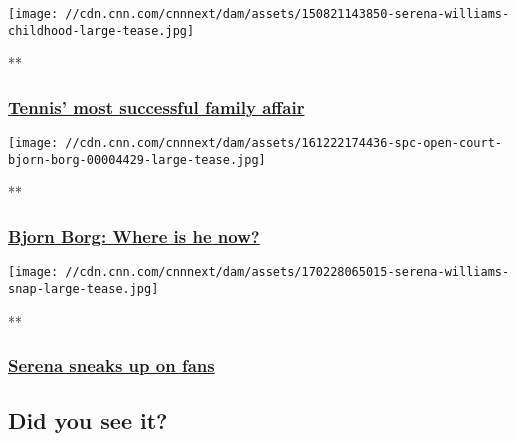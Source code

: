 \href{/videos/sports/2017/01/27/australian-open-williams-sisters-childhood.cnn}{}

\texttt{[image: //cdn.cnn.com/cnnnext/dam/assets/150821143850-serena-williams-childhood-large-tease.jpg]}

**

\hypertarget{tennis-most-successful-family-affair}{%
\subsubsection{\texorpdfstring{\href{/videos/sports/2017/01/27/australian-open-williams-sisters-childhood.cnn}{Tennis'
most successful family
affair}}{Tennis' most successful family affair}}\label{tennis-most-successful-family-affair}}

\href{/videos/sports/2016/12/22/spc-open-court-bjorn-borg.cnn}{}

\texttt{[image: //cdn.cnn.com/cnnnext/dam/assets/161222174436-spc-open-court-bjorn-borg-00004429-large-tease.jpg]}

**

\hypertarget{bjorn-borg-where-is-he-now}{%
\subsubsection{\texorpdfstring{\href{/videos/sports/2016/12/22/spc-open-court-bjorn-borg.cnn}{Bjorn
Borg: Where is he
now?}}{Bjorn Borg: Where is he now?}}\label{bjorn-borg-where-is-he-now}}

\href{/videos/sports/2017/02/28/serena-williams-surprises-fans-tennis-court-es.cnn}{}

\texttt{[image: //cdn.cnn.com/cnnnext/dam/assets/170228065015-serena-williams-snap-large-tease.jpg]}

**

\hypertarget{serena-sneaks-up-on-fans}{%
\subsubsection{\texorpdfstring{\href{/videos/sports/2017/02/28/serena-williams-surprises-fans-tennis-court-es.cnn}{Serena
sneaks up on
fans}}{Serena sneaks up on fans}}\label{serena-sneaks-up-on-fans}}

\hypertarget{did-you-see-it-}{%
\subsection{Did you see it?~}\label{did-you-see-it-}}

\href{/videos/sports/2016/12/22/spc-open-court-outtakes.cnn}{}

